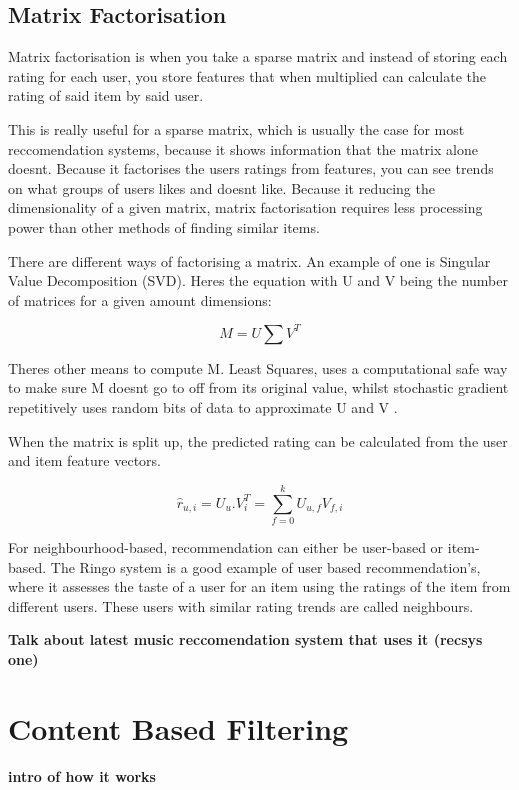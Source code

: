 \subsection{Matrix Factorisation}

Matrix factorisation is when you take a sparse matrix and instead of storing each rating for each user, you store features that when multiplied can calculate the rating of said item by said user.

This is really useful for a sparse matrix, which is usually the case for most reccomendation systems, because it shows information that the matrix alone doesnt. Because it factorises the users ratings from features, you can see trends on what groups of users likes and doesnt like. Because it reducing the dimensionality of a given matrix, matrix factorisation requires less processing power than other methods of finding similar items. 

There are different ways of factorising a matrix. An example of one is Singular Value Decomposition (SVD). Heres the equation with U and V being the number of matrices for a given amount dimensions:

\begin{equation}
	M = U \sum V ^{T}
\end{equation}

Theres other means to compute M. Least Squares, uses a computational safe way to make sure M doesnt go to off from its original value, whilst stochastic gradient repetitively uses random bits of data to approximate U and V \citep{koren_matrix_2009}. 

When the matrix is split up, the predicted rating can be calculated from the user and item feature vectors. 

\begin{equation}
	\hat{r} _{u,i} = U _{u} . V _{i}^{T} = \sum_{f=0}^{k} U_{u,f} V_{f, i}
\end{equation}

For neighbourhood-based, recommendation can either be user-based or item-based. The Ringo system is a good example of user based recommendation's, where it assesses the taste of a user for an item using the ratings of the item from different users. These users with similar rating trends are called neighbours. 

\textbf{Talk about latest music reccomendation system that uses it (recsys one)}
\section{Content Based Filtering}
\textbf{intro of how it works}

